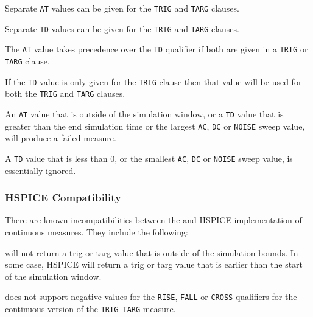 \begin{XyceItemize}
  \item Separate \texttt{AT} values can be given for the \texttt{TRIG} and
\texttt{TARG} clauses.
  \item Separate \texttt{TD} values can be given for the \texttt{TRIG} and
\texttt{TARG} clauses.
  \item The \texttt{AT} value takes precedence over the \texttt{TD} qualifier if
both are given in a \texttt{TRIG} or \texttt{TARG} clause.
  \item If the \texttt{TD} value is only given for the \texttt{TRIG} clause then
that value will be used for both the \texttt{TRIG} and \texttt{TARG} clauses.
  \item An \texttt{AT} value that is outside of the simulation window, or a 
\texttt{TD} value that is greater than the end simulation time or the largest
\texttt{AC}, \texttt{DC} or \texttt{NOISE} sweep value, will produce a failed
measure.
  \item A \texttt{TD} value that is less than 0,  or the smallest \texttt{AC},
\texttt{DC} or \texttt{NOISE} sweep value, is essentially ignored.
\end{XyceItemize}

\subsubsection{HSPICE Compatibility}
\label{Measure_CONT__HSpice_Compatibility}
There are known incompatibilities between the \Xyce{} and HSPICE implementation
of continuous measures.  They include the following:

\begin{XyceItemize}
  \item \Xyce{} will not return a trig or targ value that is outside of the simulation
bounds.  In some case, HSPICE will return a trig or targ value that is earlier than
the start of the simulation window.
  \item \Xyce{} does not support negative values for the \texttt{RISE}, \texttt{FALL} or
\texttt{CROSS} qualifiers for the continuous version of the \texttt{TRIG-TARG} measure.

\end{XyceItemize}

